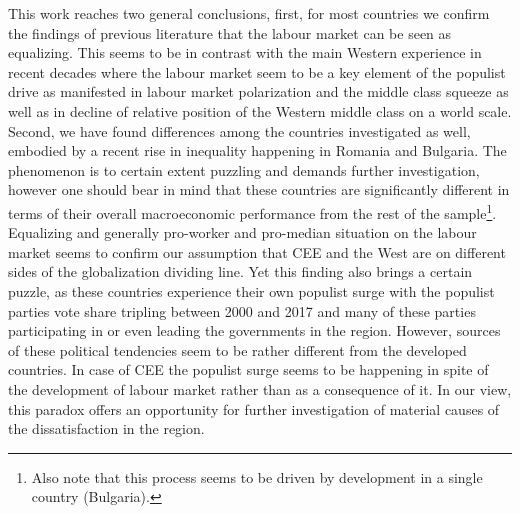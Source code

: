\documentclass{article}
\begin{document}
This work reaches two general conclusions, first, for most countries we confirm the findings of previous literature that the labour market can be seen as equalizing. This seems to be in contrast with the main Western experience in recent decades where the labour market seem to be a key element of the populist drive as manifested in labour market polarization and the middle class squeeze as well as in decline of relative position of the Western middle class on a world scale.
Second, we have found differences among the countries investigated as well, embodied by a recent rise in inequality happening in Romania and Bulgaria. The phenomenon is to certain extent puzzling and demands further investigation, however one should bear in mind that these countries are significantly different in terms of their overall macroeconomic performance from the rest of the sample\footnote{
Also note that  this process seems to be driven by development in a single country (Bulgaria).}.
\\
Equalizing and generally pro-worker and pro-median situation on the labour market seems to confirm our assumption that CEE and the West are on different sides of the globalization dividing line. Yet this finding also brings a certain puzzle, as these countries experience their own populist surge with the populist parties vote share tripling between 2000 and 2017 and many of these parties participating in or even leading the governments in the region. However, sources of these political tendencies seem to be rather different from the developed countries. In case of CEE the populist surge seems to be happening in spite of the development of labour market rather than as a consequence of it. In our view, this paradox offers an opportunity for further investigation of material causes of the dissatisfaction in the region.













\newpage
\end{document}
